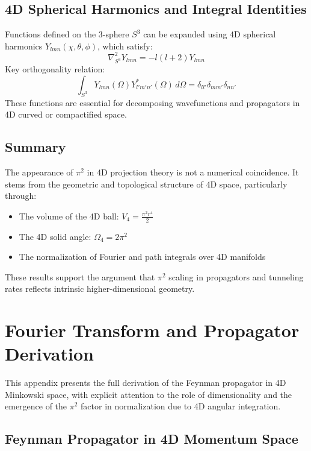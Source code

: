 \documentclass[12pt,a4paper]{article}
\begin{document}
\subsection{4D Spherical Harmonics and Integral Identities}

Functions defined on the 3-sphere \(S^3\) can be expanded using 4D spherical harmonics \(Y_{lmn}(\chi, \theta, \phi)\), which satisfy:
\begin{equation}
\nabla^2_{S^3} Y_{lmn} = -l(l+2) Y_{lmn}
\end{equation}
Key orthogonality relation:
\begin{equation}
\int_{S^3} Y_{lmn}(\Omega) Y^*_{l'm'n'}(\Omega) \, d\Omega = \delta_{ll'} \delta_{mm'} \delta_{nn'}
\end{equation}
These functions are essential for decomposing wavefunctions and propagators in 4D curved or compactified space.

\subsection{Summary}

The appearance of \(\pi^2\) in 4D projection theory is not a numerical coincidence. It stems from the geometric and topological structure of 4D space, particularly through:
\begin{itemize}
    \item The volume of the 4D ball: \(V_4 = \frac{\pi^2 r^4}{2}\)
    \item The 4D solid angle: \(\Omega_4 = 2\pi^2\)
    \item The normalization of Fourier and path integrals over 4D manifolds
\end{itemize}
These results support the argument that \(\pi^2\) scaling in propagators and tunneling rates reflects intrinsic higher-dimensional geometry.


\section{Fourier Transform and Propagator Derivation}
\label{app:propagator}

This appendix presents the full derivation of the Feynman propagator in 4D Minkowski space, with explicit attention to the role of dimensionality and the emergence of the \(\pi^2\) factor in normalization due to 4D angular integration.

\subsection{Feynman Propagator in 4D Momentum Space}
\end{document}
